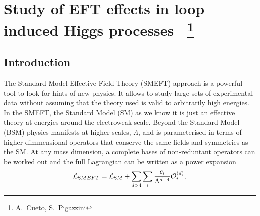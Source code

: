 \newcommand{\cpDC}{\ensuremath{c_{pDC}}\xspace}
\newcommand{\cpG}{\ensuremath{c_{pG}}\xspace}
\newcommand{\cdp}{\ensuremath{c_{dp}}\xspace}
\newcommand{\cpe}{\ensuremath{c_{pe}}\xspace}
\newcommand{\cpl}[1]{\ensuremath{c_{pl#1}}\xspace}
\newcommand{\cpmu}{\ensuremath{c_{pmu}}\xspace}
\newcommand{\cpqi}{\ensuremath{c_{pq3i}}\xspace}
\newcommand{\ctpl}[1]{\ensuremath{c_{3pl#1}}\xspace}
\newcommand{\cpd}{\ensuremath{c_{pd}}\xspace}
\newcommand{\cpQ}{\ensuremath{c_{pQ3}}\xspace}
\newcommand{\cpQM}{\ensuremath{c_{pQM}}\xspace}
\newcommand{\cpqMi}{\ensuremath{c_{pqMi}}\xspace}
\newcommand{\cpt}{\ensuremath{c_{pt}}\xspace}
\newcommand{\cpu}{\ensuremath{c_{pu}}\xspace}
\newcommand{\ctG}{\ensuremath{c_{tG}}\xspace}
\newcommand{\ctp}{\ensuremath{c_{tp}}\xspace}
\newcommand{\cpW}{\ensuremath{c_{pW}}\xspace}
\newcommand{\cpBB}{\ensuremath{c_{pBB}}\xspace}
\newcommand{\cpWB}{\ensuremath{c_{pWB}}\xspace}
\newcommand{\ctB}{\ensuremath{c_{tB}}\xspace}
\newcommand{\ctW}{\ensuremath{c_{tW}}\xspace}



\section{Study of EFT effects in loop induced Higgs processes ~\protect\footnote{
  A.~Cueto,
  S.~Pigazzini}{}}

\label{sec:projname}



\subsection{Introduction}
\label{sec:higgseft:section1}
The Standard Model Effective Field Theory (SMEFT) approach is a powerful tool to look for hints of new physics. It allows to study large sets of experimental data without assuming that the theory used is valid to arbitrarily high energies. In the SMEFT, the Standard Model (SM) as we know it is just an effective theory at energies around the electroweak scale. Beyond the Standard Model (BSM) physics manifests at higher scales, $\Lambda$, and is parameterised in terms of higher-dimmensional operators that conserve the same fields and symmetries as the SM. At any mass dimension, a complete bases of non-reduntant operators can be worked out and the full Lagrangian can be written as a power expansion
\begin{equation}
\mathcal{L}_{\textrm SMEFT} = \mathcal{L}_{\textrm SM} + \sum_{d>4}\sum_{i}\frac{c_i}{\Lambda^{d-4}}\mathcal{O}_{i}^{(d)},
\end{equation}  

